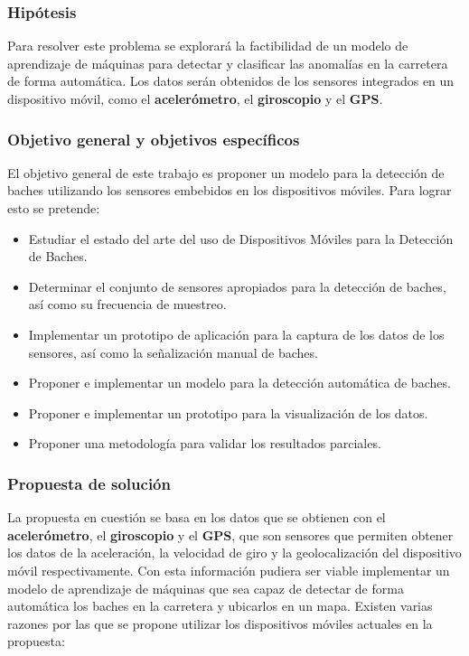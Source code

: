 	\subsubsection*{Hipótesis}
		Para resolver este problema se explorará la factibilidad de un modelo de aprendizaje de máquinas para detectar y clasificar las anomalías en la
		carretera de forma automática. Los datos serán obtenidos de los sensores integrados en un dispositivo móvil, como el \textbf{acelerómetro},
		el \textbf{giroscopio} y el \textbf{GPS}.

	\subsubsection*{Objetivo general y objetivos específicos}
		El objetivo general de este trabajo es proponer un modelo para la detección de baches utilizando los sensores embebidos en los
		dispositivos móviles. Para lograr esto se pretende:

		\begin{itemize}
			\item Estudiar el estado del arte del uso de Dispositivos Móviles para la Detección de Baches.
			\item Determinar el conjunto de sensores apropiados para la detección de baches, así como su frecuencia de muestreo.
			\item Implementar un prototipo de aplicación para la captura de los datos de los sensores, así como la señalización
				manual de baches.
			\item Proponer e implementar un modelo para la detección automática de baches.
			\item Proponer e implementar un prototipo para la visualización de los datos.
			\item Proponer una metodología para validar los resultados parciales.
		\end{itemize}

	\subsubsection*{Propuesta de solución}
		La propuesta en cuestión se basa en los datos que se obtienen con el \textbf{acelerómetro}, el \textbf{giroscopio} y el \textbf{GPS}, que
		son sensores que permiten obtener los datos de la aceleración, la velocidad de giro y la geolocalización del dispositivo móvil respectivamente.
		Con esta información pudiera ser viable implementar un modelo de aprendizaje de máquinas que sea capaz de detectar de forma automática los baches
		en la carretera y ubicarlos en un mapa. Existen varias razones por las que se propone utilizar los dispositivos móviles actuales en la propuesta:\\

